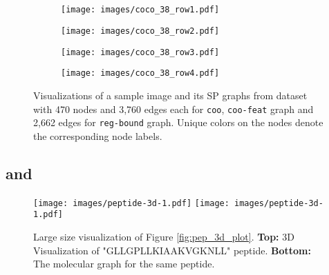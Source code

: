 \documentclass{article}
\begin{document}
\subsection{\coco}
\begin{figure}[!h]
\centering
\begin{subfigure}
  \centering
  \texttt{[image: images/coco\_38\_row1.pdf]}  
\label{fig:coco-row1}
\end{subfigure}
\vspace{-20pt}
\begin{subfigure}
  \centering
  \texttt{[image: images/coco\_38\_row2.pdf]}  
\label{fig:coco-row2}
\end{subfigure}
\vspace{-20pt}
\begin{subfigure}
  \centering
  \texttt{[image: images/coco\_38\_row3.pdf]}  
\label{fig:coco-row3}
\end{subfigure}
\vspace{-20pt}
\begin{subfigure}
  \centering
  \texttt{[image: images/coco\_38\_row4.pdf]}  
\label{fig:coco-row4}
\end{subfigure}
\caption{Visualizations of a sample image and its SP graphs from \coco dataset with 470 nodes and 3,760 edges each for \texttt{coo}, \texttt{coo-feat} graph and 2,662 edges for \texttt{reg-bound} graph. Unique colors on the nodes denote the corresponding node labels.}
\label{fig:fig_viz_coco}
\end{figure}



\newpage
\subsection{\pepfunc and \pepstruct}

\begin{figure}[h]
    
    \centering
\texttt{[image: images/peptide-3d-1.pdf]}
    \vspace{40pt}
    \texttt{[image: images/peptide-3d-1.pdf]}
    \vspace{-10pt}
    \caption{Large size visualization of Figure \ref{fig:pep_3d_plot}. \textbf{Top:} 3D Visualization of "GLLGPLLKIAAKVGKNLL" peptide. \textbf{Bottom:} The molecular graph for the same peptide. }
    \label{fig:pep_3d_plot_large}
    
\end{figure}
\end{document}
